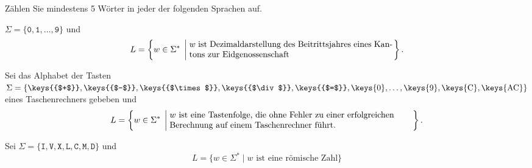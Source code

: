 Zählen Sie mindestens 5 Wörter in jeder der folgenden Sprachen auf.
\begin{teilaufgaben}
\item $\Sigma= \{\texttt{0},\texttt{1},\dots,\texttt{9}\}$ und
\[
L=\left\{ w\in\Sigma^*\;\left|\;
\begin{minipage}{8.4cm}
$w$ ist Dezimaldarstellung des Beitrittsjahres eines Kantons zur
Eidgenossenschaft
\end{minipage}
\right.\right\}.
\]
\item Sei das Alphabet der Tasten 
$\Sigma = \{
\text{\keys{{$+$}}},
\text{\keys{{$-$}}},
\text{\keys{{$\times$}}},
\text{\keys{{$\div$}}},
\text{\keys{{$=$}}},
\text{\keys{0}},
\dots,
\text{\keys{9}},
\text{\keys{C}},
\text{\keys{AC}}
\}
$
eines Taschenrechners gebeben und
\[
L=\left\{
w\in\Sigma^*\;
\left|
\;
\begin{minipage}{10cm}\raggedright
$w$ ist eine Tastenfolge, die ohne Fehler zu einer erfolgreichen Berechnung
auf einem Taschenrechner führt.
\end{minipage}
\right.
\right\}.
\]
\item
Sei $\Sigma = \{
\texttt{I},
\texttt{V},
\texttt{X},
\texttt{L},
\texttt{C},
\texttt{M},
\texttt{D}\}$ und
\[
L=\{
w\in\Sigma^*\;
|
\;
\text{$w$ ist eine römische Zahl}
\}
\]
\end{teilaufgaben}


